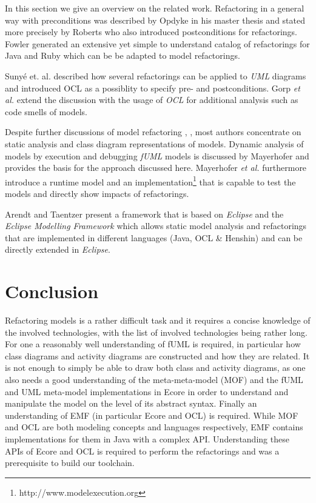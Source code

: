 \documentclass{llncs}
\begin{document}
In this section we give an overview on the related work. Refactoring in a general way with preconditions was described
by Opdyke \cite{mast:REFOOF} in his master thesis and stated more precisely by Roberts \cite{rob99} who also introduced
postconditions for refactorings. Fowler \cite{fow99} generated an extensive yet simple to understand catalog of
refactorings for Java and Ruby which can be be adapted to model refactorings.


Suny{\'e} et. al. \cite{DBLP:conf/uml/SunyePTJ01} described how several refactorings can be applied to \textit{UML}
diagrams and introduced OCL as a possiblity to specify pre- and postconditions. Gorp \textit{et al.} \cite{gorp03} extend the
discussion with the usage of \textit{OCL} for additional analysis such as code smells of models.


Despite further discussions of model refactoring \cite{DBLP:conf/uml/CorreaW04}, \cite{DBLP:conf/ershov/BaarM06},
\cite{DBLP:journals/ase/ArendtT13} most authors concentrate on static analysis and class diagram representations of
models. Dynamic analysis of models by execution and debugging \textit{fUML} models is discussed by Mayerhofer
\cite{DBLP:conf/icse/Mayerhofer12} and provides the basis for the approach discussed here. Mayerhofer \textit{et al.}
\cite{DBLP:conf/models/MayerhoferLK12} furthermore introduce a runtime model and an
implementation\footnote{http://www.modelexecution.org} that is capable to test the models and directly show impacts of
refactorings.


Arendt and Taentzer \cite{DBLP:journals/ase/ArendtT13} present a framework that is based on \textit{Eclipse} and the
\textit{Eclipse Modelling Framework} which allows static model analysis and refactorings that are implemented in
different languages (Java, OCL \& Henshin) and can be directly extended in \textit{Eclipse}.


\section{Conclusion}
\label{sec:conclusion}
Refactoring models is a rather difficult task and it requires a concise knowledge of the involved technologies, with
the list of involved technologies being rather long. For one a reasonably well understanding of fUML is required, in
particular how class diagrams and activity diagrams are constructed and how they are related. It is not enough to simply
be able to draw both class and activity diagrams, as one also needs a good understanding of the meta-meta-model (MOF) and
the fUML and UML meta-model implementations in Ecore in order to understand and manipulate the model on the level of its 
abstract syntax. Finally an understanding of EMF (in particular Ecore and OCL) is required. While MOF and OCL are both 
modeling concepts and languages respectively, EMF contains implementations for them in Java with a complex API. 
Understanding these APIs of Ecore and OCL is required to perform the refactorings and was a prerequisite to build
our toolchain.
\end{document}
